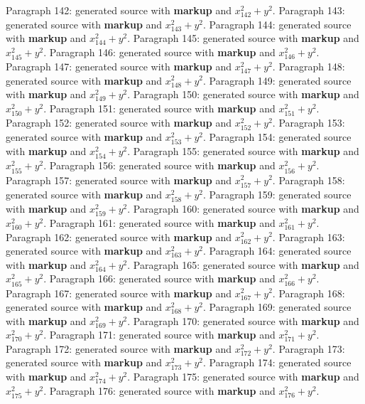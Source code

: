 \documentclass{article}
\begin{document}
Paragraph 142: generated source with \textbf{markup} and $x_{142}^2 + y^2$.
Paragraph 143: generated source with \textbf{markup} and $x_{143}^2 + y^2$.
Paragraph 144: generated source with \textbf{markup} and $x_{144}^2 + y^2$.
Paragraph 145: generated source with \textbf{markup} and $x_{145}^2 + y^2$.
Paragraph 146: generated source with \textbf{markup} and $x_{146}^2 + y^2$.
Paragraph 147: generated source with \textbf{markup} and $x_{147}^2 + y^2$.
Paragraph 148: generated source with \textbf{markup} and $x_{148}^2 + y^2$.
Paragraph 149: generated source with \textbf{markup} and $x_{149}^2 + y^2$.
Paragraph 150: generated source with \textbf{markup} and $x_{150}^2 + y^2$.
Paragraph 151: generated source with \textbf{markup} and $x_{151}^2 + y^2$.
Paragraph 152: generated source with \textbf{markup} and $x_{152}^2 + y^2$.
Paragraph 153: generated source with \textbf{markup} and $x_{153}^2 + y^2$.
Paragraph 154: generated source with \textbf{markup} and $x_{154}^2 + y^2$.
Paragraph 155: generated source with \textbf{markup} and $x_{155}^2 + y^2$.
Paragraph 156: generated source with \textbf{markup} and $x_{156}^2 + y^2$.
Paragraph 157: generated source with \textbf{markup} and $x_{157}^2 + y^2$.
Paragraph 158: generated source with \textbf{markup} and $x_{158}^2 + y^2$.
Paragraph 159: generated source with \textbf{markup} and $x_{159}^2 + y^2$.
Paragraph 160: generated source with \textbf{markup} and $x_{160}^2 + y^2$.
Paragraph 161: generated source with \textbf{markup} and $x_{161}^2 + y^2$.
Paragraph 162: generated source with \textbf{markup} and $x_{162}^2 + y^2$.
Paragraph 163: generated source with \textbf{markup} and $x_{163}^2 + y^2$.
Paragraph 164: generated source with \textbf{markup} and $x_{164}^2 + y^2$.
Paragraph 165: generated source with \textbf{markup} and $x_{165}^2 + y^2$.
Paragraph 166: generated source with \textbf{markup} and $x_{166}^2 + y^2$.
Paragraph 167: generated source with \textbf{markup} and $x_{167}^2 + y^2$.
Paragraph 168: generated source with \textbf{markup} and $x_{168}^2 + y^2$.
Paragraph 169: generated source with \textbf{markup} and $x_{169}^2 + y^2$.
Paragraph 170: generated source with \textbf{markup} and $x_{170}^2 + y^2$.
Paragraph 171: generated source with \textbf{markup} and $x_{171}^2 + y^2$.
Paragraph 172: generated source with \textbf{markup} and $x_{172}^2 + y^2$.
Paragraph 173: generated source with \textbf{markup} and $x_{173}^2 + y^2$.
Paragraph 174: generated source with \textbf{markup} and $x_{174}^2 + y^2$.
Paragraph 175: generated source with \textbf{markup} and $x_{175}^2 + y^2$.
Paragraph 176: generated source with \textbf{markup} and $x_{176}^2 + y^2$.
\end{document}
